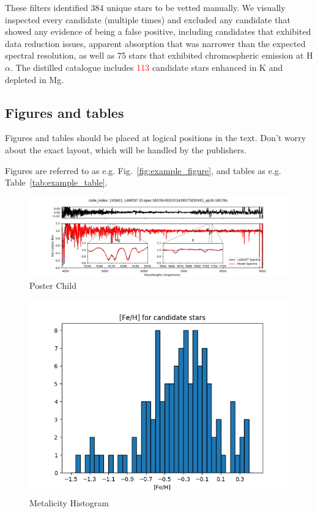 \documentclass[a4paper,fleqn,usenatbib]{mnras}
\newcommand{\todo}[1]{\textcolor{red}{#1}}
\begin{document}
These filters identified 384 unique stars to be vetted manually. We visually inspected every candidate (multiple times) and excluded any candidate that showed any evidence of being a false positive, including candidates that exhibited data reduction issues, apparent absorption that was narrower than the expected spectral resolution, as well as 75 stars that exhibited chromospheric emission at H$\alpha$. The distilled catalogue includes \todo{113} candidate stars enhanced in K and depleted in Mg.


\subsection{Figures and tables}

Figures and tables should be placed at logical positions in the text. Don't
worry about the exact layout, which will be handled by the publishers.

Figures are referred to as e.g. Fig.~\ref{fig:example_figure}, and tables as
e.g. Table~\ref{tab:example_table}.




\begin{figure}
	\includegraphics[width=\columnwidth]{posterchildof13.png}
    \caption{Poster Child}
    \label{posterchild}
\end{figure}

\begin{figure}
	\includegraphics[width=\columnwidth]{histof113.png}
    \caption{Metalicity Histogram}
    \label{mhist}
\end{figure}
\end{document}
